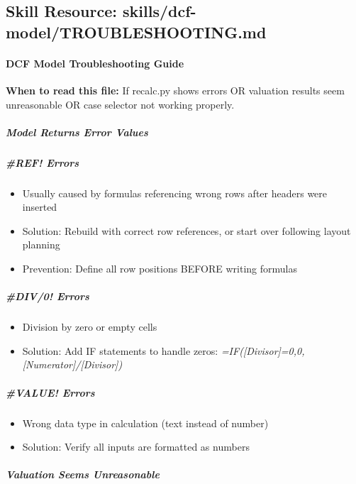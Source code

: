 \documentclass[11pt]{article}
\begin{document}
\subsection{Skill Resource: skills/dcf-model/TROUBLESHOOTING.md}\label{file:skills-dcf-model-TROUBLESHOOTING-md}

\paragraph{DCF Model Troubleshooting Guide}\mbox{}\par

\textbf{When to read this file:} If recalc.py shows errors OR valuation results seem unreasonable OR case selector not working properly.


\subparagraph{Model Returns Error Values}\mbox{}\par

\subparagraph{\#REF! Errors}\mbox{}\par
\begin{itemize}[leftmargin=*,itemsep=2pt,topsep=2pt]
\item {} Usually caused by formulas referencing wrong rows after headers were inserted
\item {} Solution: Rebuild with correct row references, or start over following layout planning
\item {} Prevention: Define all row positions BEFORE writing formulas
\end{itemize}

\subparagraph{\#DIV/0! Errors}\mbox{}\par
\begin{itemize}[leftmargin=*,itemsep=2pt,topsep=2pt]
\item {} Division by zero or empty cells
\item {} Solution: Add IF statements to handle zeros: \emph{=IF([Divisor]=0,0,[Numerator]/[Divisor])}
\end{itemize}

\subparagraph{\#VALUE! Errors}\mbox{}\par
\begin{itemize}[leftmargin=*,itemsep=2pt,topsep=2pt]
\item {} Wrong data type in calculation (text instead of number)
\item {} Solution: Verify all inputs are formatted as numbers
\end{itemize}

\subparagraph{Valuation Seems Unreasonable}\mbox{}\par
\end{document}
